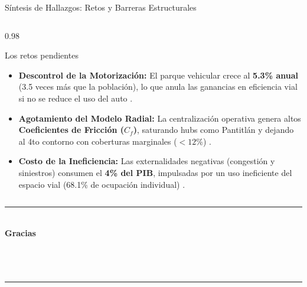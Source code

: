 \begin{frame}{Síntesis de Hallazgos: Retos y Barreras Estructurales}
  \begin{columns}[T]
    \begin{column}{0.98\textwidth}
      \begin{alertblock}{Los retos pendientes}
        \begin{itemize}
          \item \textbf{Descontrol de la Motorización:} El parque vehicular crece al \textbf{5.3\% anual} 
                (3.5 veces más que la población), lo que anula las ganancias en eficiencia vial si no se 
                reduce el uso del auto \cite{SEDATU2023}.
          \item \textbf{Agotamiento del Modelo Radial:} La centralización operativa genera altos 
                \textbf{Coeficientes de Fricción ($C_f$)}, saturando hubs como Pantitlán y dejando al 
                  4to contorno con coberturas marginales ($<12\%$) \cite{Garibaldi2024_R02}.
          \item \textbf{Costo de la Ineficiencia:} Las externalidades negativas (congestión y siniestros) 
                consumen el \textbf{4\% del PIB}, impulsadas por un uso ineficiente del espacio vial 
                (68.1\% de ocupación individual) \cite{ramirez2025analisis}.
        \end{itemize}
      \end{alertblock}
    \end{column}
  \end{columns}
\end{frame}

\begin{frame}[plain]
  \begin{center}
    \vfill
    {\color{ColorAcento}\rule{0.6\textwidth}{1.5pt}}\\[0.5cm]
    {\Large\bfseries\color{ColorPrincipal} Gracias}\\[0.3cm]
    {\normalsize \Autor}\\[0.1cm]
    {\small \MateriaCorta}\\[0.1cm]
    {\small \Semestre}\\[0.5cm]
    {\color{ColorAcento}\rule{0.6\textwidth}{1.5pt}}
    \vfill
  \end{center}
\end{frame}
